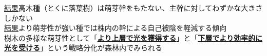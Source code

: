 \documentclass[a0, 30pt, plainboxedsections]{sciposter} %
\begin{document}
\begin{multicols}{2}
\begin{mdframed}[style=conclusion.frame,frametitle={\textbf{\color{Black1}{
  \large\textbf{\faFlagAlt \vspace{0.02em} 結論: {萌芽性は最大樹高と相反して発達し、多様な受光体制の存在が樹種の共存に貢献している}}}}}]
  \vspace{0.4em}
  \normalsize{\underline{結果}高木種（とくに落葉樹）は萌芽幹をもたない、主幹に対してわずかな大きさしかない\\
  \underline{結果}より萌芽性が強い種では株内の幹による自己被陰を軽減する傾向\\
  }
  \large{\faHandLeft \vspace{0.02em} 樹木の多様な萌芽性として「\textbf{\underline{より上層で光を獲得する}}」と「\textbf{\underline{下層でより効率的に光を受ける}}」という戦略分化が森林内でみられる
  } %
\end{mdframed}
\end{multicols}
\begin{mdframed}[style=section.frame]
  \centering\LARGE\textbf{\color{white}{方法}}
\end{mdframed}
\end{document}
